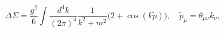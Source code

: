 \begin{equation}
\Delta \Sigma = \frac{g^2}6\int \frac{d^4k}{(2\pi)^4} \frac1{k^2+m^2}
\big(2+\cos(k\tilde p)\big),\quad \tilde p_\mu = \theta_{\mu\nu}k_\nu,
\end{equation}

